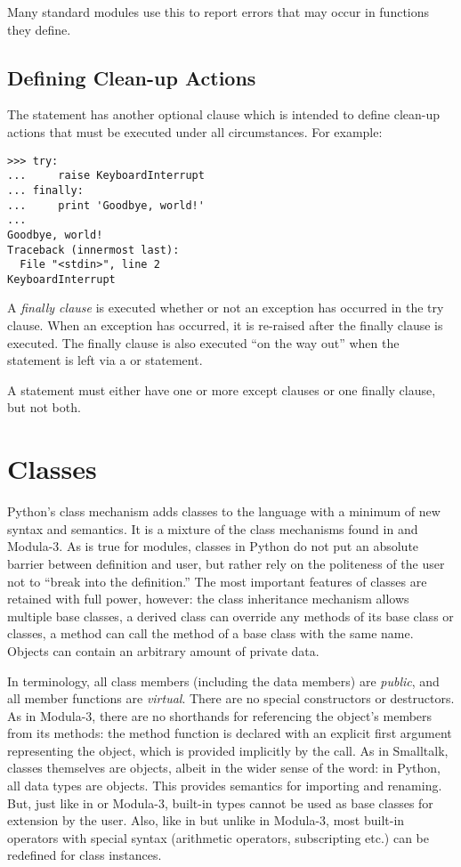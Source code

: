 \documentclass{manual}
\begin{document}
Many standard modules use this to report errors that may occur in
functions they define.


\section{Defining Clean-up Actions}
\label{cleanup}

The  statement has another optional clause which is
intended to define clean-up actions that must be executed under all
circumstances.  For example:

\begin{verbatim}
>>> try:
...     raise KeyboardInterrupt
... finally:
...     print 'Goodbye, world!'
... 
Goodbye, world!
Traceback (innermost last):
  File "<stdin>", line 2
KeyboardInterrupt
\end{verbatim}

A \emph{finally clause} is executed whether or not an exception has
occurred in the try clause.  When an exception has occurred, it is
re-raised after the finally clause is executed.  The finally clause is
also executed ``on the way out'' when the  statement is
left via a  or  statement.

A  statement must either have one or more except clauses
or one finally clause, but not both.

\chapter{Classes}
\label{classes}

Python's class mechanism adds classes to the language with a minimum
of new syntax and semantics.  It is a mixture of the class mechanisms
found in \Cpp{} and Modula-3.  As is true for modules, classes in Python
do not put an absolute barrier between definition and user, but rather
rely on the politeness of the user not to ``break into the
definition.''  The most important features of classes are retained
with full power, however: the class inheritance mechanism allows
multiple base classes, a derived class can override any methods of its
base class or classes, a method can call the method of a base class with the
same name.  Objects can contain an arbitrary amount of private data.

In \Cpp{} terminology, all class members (including the data members) are
\emph{public}, and all member functions are \emph{virtual}.  There are
no special constructors or destructors.  As in Modula-3, there are no
shorthands for referencing the object's members from its methods: the
method function is declared with an explicit first argument
representing the object, which is provided implicitly by the call.  As
in Smalltalk, classes themselves are objects, albeit in the wider
sense of the word: in Python, all data types are objects.  This
provides semantics for importing and renaming.  But, just like in \Cpp{}
or Modula-3, built-in types cannot be used as base classes for
extension by the user.  Also, like in \Cpp{} but unlike in Modula-3, most
built-in operators with special syntax (arithmetic operators,
subscripting etc.) can be redefined for class instances.
\end{document}
